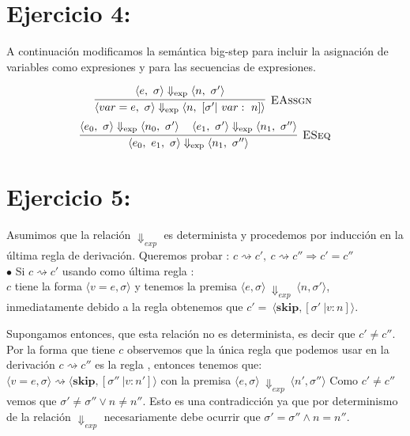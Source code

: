 \documentclass[11pt, fleqn]{article}
\begin{document}

\section*{Ejercicio 4:}

A continuación modificamos la semántica big-step para incluir la asignación de variables como
expresiones y para las secuencias de expresiones.

\[
\infr[\rn{EAssgn}]
  {
    \sexp{\pair{e}{\sigma}}{\pair{n}{\sigma'}}
  }
  {
    \sexp{\pair{\eassgn{var}{e}}{\sigma}}{\pair{n}{\extf{\sigma'}{var}{n}}}
  }
\
\]
\smallskip
\[
\infr[\rn{ESeq}]
  {
    \sexp{\pair{e_0}{\sigma}}{\pair{n_0}{\sigma'}}
    \quad
    \sexp{\pair{e_1}{\sigma'}}{\pair{n_1}{\sigma''}}
  }
  {
    \sexp{\pair{\eseq{e_0}{e_1}}{\sigma}}{\pair{n_1}{\sigma''}}
  }
\]


\section*{Ejercicio 5:}

Asumimos que la relación $\Downarrow_{exp}$ es determinista y procedemos por inducción
en la última regla de derivación.
Queremos probar : $ c \rightsquigarrow c', \: c \rightsquigarrow c'' \Rightarrow c' = c'' $ \\

$\bullet$ Si $ c \rightsquigarrow c' $ usando como última regla : \\
$c$ tiene la forma $\langle v=e, \sigma \rangle$ y tenemos la premisa
$\langle e, \sigma \rangle \: \Downarrow_{exp} \: \langle n, \sigma' \rangle$,
inmediatamente debido a la regla \rn{Asumimos} obtenemos que
$c' = \: \langle \textbf{skip}, [\sigma' \: \vert v : n] \rangle$.

Supongamos entonces, que esta relación no es determinista, es decir que $ c' \neq c'' $.
Por la forma que tiene $c$ observemos que la única regla que podemos usar en la
derivación $ c \rightsquigarrow c'' $ es la regla \rn{Asumimos}, entonces tenemos que:
$ \langle v=e, \sigma \rangle \rightsquigarrow \langle \textbf{skip}, [\sigma'' \: \vert v : n'] \rangle$
con la premisa $\langle e, \sigma \rangle \: \Downarrow_{exp} \: \langle n', \sigma'' \rangle$
Como $ c' \neq c'' $ vemos que $ \sigma' \neq \sigma'' \lor n \neq n''$.
Esto es una contradicción ya que por determinismo de la relación $\Downarrow_{exp}$ 
necesariamente debe ocurrir que $ \sigma' = \sigma'' \land n = n''$. \\
\end{document}
